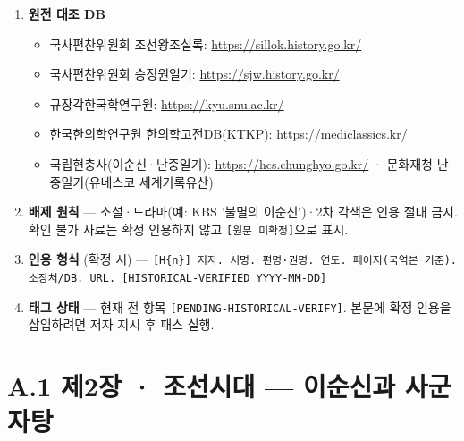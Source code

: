 \documentclass[12pt,oneside]{book}
\begin{document}
\begin{enumerate}[leftmargin=6mm,itemsep=1pt,topsep=2pt]
  \item \textbf{원전 대조 DB}
\begin{itemize}[leftmargin=6mm,itemsep=1pt,topsep=2pt]
  \item 국사편찬위원회 조선왕조실록: \url{https://sillok.history.go.kr/}
  \item 국사편찬위원회 승정원일기: \url{https://sjw.history.go.kr/}
  \item 규장각한국학연구원: \url{https://kyu.snu.ac.kr/}
  \item 한국한의학연구원 한의학고전DB(KTKP): \url{https://mediclassics.kr/}
  \item 국립현충사(이순신·난중일기): \url{https://hcs.chunghyo.go.kr/} · 문화재청 난중일기(유네스코 세계기록유산)
\end{itemize}
  \item \textbf{배제 원칙} — 소설·드라마(예: KBS '불멸의 이순신')·2차 각색은 인용 절대 금지. 확인 불가 사료는 확정 인용하지 않고 \texttt{[원문 미확정]}으로 표시.
  \item \textbf{인용 형식} (확정 시) — \texttt{[H\{n\}] 저자. 서명. 편명·권명. 연도. 페이지(국역본 기준). 소장처/DB. URL. [HISTORICAL-VERIFIED YYYY-MM-DD]}
  \item \textbf{태그 상태} — 현재 전 항목 \texttt{[PENDING-HISTORICAL-VERIFY]}. 본문에 확정 인용을 삽입하려면 저자 지시 후 패스 실행.
\end{enumerate}

\section{A.1 제2장 · 조선시대 — 이순신과 사군자탕}

\vspace{2pt}\vspace{3pt}
\end{document}
